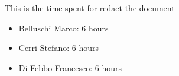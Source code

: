 This is the time spent for redact the document
\begin{itemize}
	\item Belluschi Marco:  6 hours
	\item Cerri Stefano:  6 hours
	\item Di Febbo Francesco: 6 hours
\end{itemize}